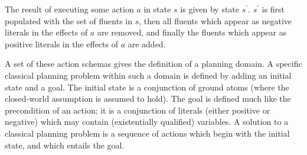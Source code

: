 The result of executing some action $a$ in state $s$ is given by state $s^\prime$. $s^\prime$ is first populated with the set of fluents in $s$, then all fluents which appear as negative literals in the effects of $a$ are removed, and finally the fluents which appear as positive literals in the effects of $a$ are added. 

A set of these action schemas gives the definition of a planning domain. A specific classical planning problem within such a domain is defined by adding an initial state and a goal. The initial state is a conjunction of ground atoms (where the closed-world assumption is assumed to hold). The goal is defined much like the precondition of an action; it is a conjunction of literals (either positive or negative) which may contain (existentially qualified) variables. A solution to a classical planning problem is a sequence of actions which begin with the initial state, and which entails the goal. 